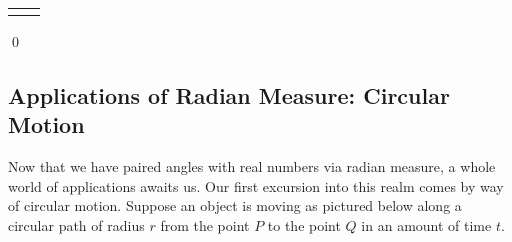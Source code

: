 \documentclass[12pt]{ximera}
\begin{document}
\begin{example}
\begin{enumerate}
\begin{tabular}{cc}
&

\hspace{1in}

  \\

\end{tabular}

\end{enumerate}

\vspace{-.05in} \qed

\end{example}


\subsection{Applications of Radian Measure:  Circular Motion}
\label{circularmotion}

Now that we have paired angles with real numbers via radian measure, a whole world of applications awaits us.  Our first excursion into this realm comes by way of circular motion.  Suppose an object is moving as pictured below along a circular path of radius $r$ from the point $P$ to the point $Q$ in an amount of time $t$.  
 
\begin{center}
 
 

\end{center}
\end{document}
